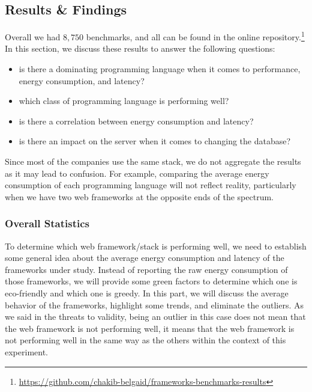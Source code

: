 \subsection{Results \& Findings}
Overall we had $8,750$ benchmarks, and all can be found in the online repository.\footnote{\url{https://github.com/chakib-belgaid/frameworks-benchmarks-results}}
In this section, we discuss these results to answer the following questions:
\begin{itemize}
    \item is there a dominating programming language when it comes to performance, energy consumption, and latency?
    \item which class of programming language is performing well?
    \item is there a correlation between energy consumption and latency?
    \item is there an impact on the server when it comes to changing the database?
\end{itemize}

Since most of the companies use the same stack, we do not aggregate the results as it may lead to confusion.
For example, comparing the average energy consumption of each programming language will not reflect reality, particularly when we have two web frameworks at the opposite ends of the spectrum.

\subsubsection{Overall Statistics}
To determine which web framework/stack is performing well, we need to establish some general idea about the average energy consumption and latency of the frameworks under study.
Instead of reporting the raw energy consumption of those frameworks, we will provide some green factors to determine which one is eco-friendly and which one is greedy.
In this part, we will discuss the average behavior of the frameworks, highlight some trends, and eliminate the outliers.
As we said in the threats to validity, being an outlier in this case does not mean that the web framework is not performing well, it means that the web framework is not performing well in the same way as the others within the context of this experiment.

